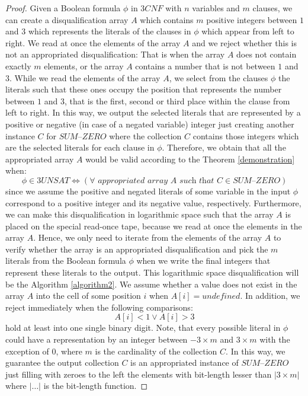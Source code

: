 \documentclass[a4paper,UKenglish,cleveref, autoref]{lipics-v2019}
\begin{document}
\begin{proof}
Given a Boolean formula $\phi$ in $3CNF$ with $n$ variables and $m$ clauses, we can create a disqualification array $A$ which contains $m$ positive integers between $1$ and $3$ which represents the literals of the clauses in $\phi$ which appear from left to right. We read at once the elements of the array $A$ and we reject whether this is not an appropriated disqualification: That is when the array $A$ does not contain exactly $m$ elements, or the array $A$ contains a number that is not between $1$ and $3$. While we read the elements of the array $A$, we select from the clauses $\phi$ the literals such that these ones occupy the position that represents the number between $1$ and $3$, that is the first, second or third place within the clause from left to right. In this way, we output the selected literals that are represented by a positive or negative (in case of a negated variable) integer just creating another instance $C$ for $\textit{SUM--ZERO}$ where the collection $C$ contains those integers which are the selected literals for each clause in $\phi$. Therefore, we obtain that all the appropriated array $A$ would be valid according to the Theorem \ref{demonstration} when:
\[\phi \in 3UNSAT \Leftrightarrow (\forall \textit{ appropriated array } A \textit{ such that } C \in \textit{SUM--ZERO})\]
since we assume the positive and negated literals of some variable in the input $\phi$ correspond to a positive integer and its negative value, respectively. Furthermore, we can make this disqualification in logarithmic space such that the array $A$ is placed on the special read-once tape, because we read at once the elements in the array $A$. Hence, we only need to iterate from the elements of the array $A$ to verify whether the array is an appropriated disqualification and pick the $m$ literals from the Boolean formula $\phi$ when we write the final integers that represent these literals to the output. This logarithmic space disqualification will be the Algorithm \ref{algorithm2}. We assume whether a value does not exist in the array $A$ into the cell of some position $i$ when $A[i] = \textit{undefined}$. In addition, we reject immediately when the following comparisons:
\[A[i] < 1 \vee A[i] > 3\]
hold at least into one single binary digit. Note, that every possible literal in $\phi$ could have a representation by an integer between $-3 \times m$ and $3 \times m$ with the exception of $0$, where $m$ is the cardinality of the collection $C$. In this way, we guarantee the output collection $C$ is an appropriated instance of $\textit{SUM--ZERO}$ just filling with zeroes to the left the elements with bit-length lesser than $|3 \times m|$ where $|\ldots|$ is the bit-length function.
\end{proof}
\end{document}
